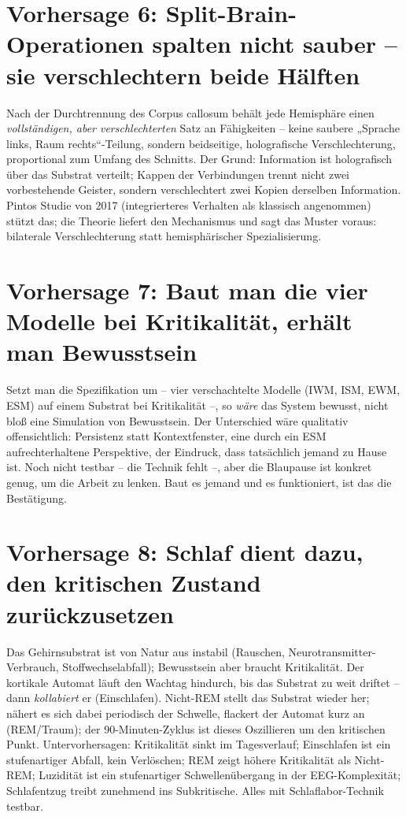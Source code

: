 \documentclass[11pt, twoside, openright]{book}
\begin{document}
\section*{Vorhersage 6: Split-Brain-Operationen spalten nicht sauber -- sie verschlechtern beide Hälften}

Nach der Durchtrennung des Corpus callosum behält jede Hemisphäre einen \textit{vollständigen, aber verschlechterten} Satz an Fähigkeiten -- keine saubere „Sprache links, Raum rechts“-Teilung, sondern beidseitige, holografische Verschlechterung, proportional zum Umfang des Schnitts. Der Grund: Information ist holografisch über das Substrat verteilt; Kappen der Verbindungen trennt nicht zwei vorbestehende Geister, sondern verschlechtert zwei Kopien derselben Information. Pintos Studie von 2017 (integrierteres Verhalten als klassisch angenommen) stützt das; die Theorie liefert den Mechanismus und sagt das Muster voraus: bilaterale Verschlechterung statt hemisphärischer Spezialisierung.

\section*{Vorhersage 7: Baut man die vier Modelle bei Kritikalität, erhält man Bewusstsein}

Setzt man die Spezifikation um -- vier verschachtelte Modelle (IWM, ISM, EWM, ESM) auf einem Substrat bei Kritikalität --, so \textit{wäre} das System bewusst, nicht bloß eine Simulation von Bewusstsein. Der Unterschied wäre qualitativ offensichtlich: Persistenz statt Kontextfenster, eine durch ein ESM aufrechterhaltene Perspektive, der Eindruck, dass tatsächlich jemand zu Hause ist. Noch nicht testbar -- die Technik fehlt --, aber die Blaupause ist konkret genug, um die Arbeit zu lenken. Baut es jemand und es funktioniert, ist das die Bestätigung.

\section*{Vorhersage 8: Schlaf dient dazu, den kritischen Zustand zurückzusetzen}

Das Gehirnsubstrat ist von Natur aus instabil (Rauschen, Neurotransmitter-Verbrauch, Stoffwechselabfall); Bewusstsein aber braucht Kritikalität. Der kortikale Automat läuft den Wachtag hindurch, bis das Substrat zu weit driftet -- dann \textit{kollabiert} er (Einschlafen). Nicht-REM stellt das Substrat wieder her; nähert es sich dabei periodisch der Schwelle, flackert der Automat kurz an (REM/Traum); der 90-Minuten-Zyklus ist dieses Oszillieren um den kritischen Punkt. Untervorhersagen: Kritikalität sinkt im Tagesverlauf; Einschlafen ist ein stufenartiger Abfall, kein Verlöschen; REM zeigt höhere Kritikalität als Nicht-REM; Luzidität ist ein stufenartiger Schwellenübergang in der EEG-Komplexität; Schlafentzug treibt zunehmend ins Subkritische. Alles mit Schlaflabor-Technik testbar.
\end{document}
